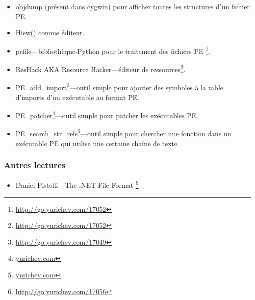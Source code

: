 \begin{itemize}
\item objdump (présent dans cygwin) pour afficher toutes les structures d'un fichier PE.

\item Hiew() comme éditeur.

\item pefile---bibliothèque-Python pour le traitement des fichiers PE \footnote{\url{http://go.yurichev.com/17052}}.

\item ResHack \acs{AKA} Resource Hacker---éditeur de ressources\footnote{\url{http://go.yurichev.com/17052}}.

\item PE\_add\_import\footnote{\url{http://go.yurichev.com/17049}}---outil simple
pour ajouter des symboles à la table d'imports d'un exécutable au format PE.

\item PE\_patcher\footnote{\href{http://go.yurichev.com/17054}{yurichev.com}}---outil
simple pour patcher les exécutables PE.

\item PE\_search\_str\_refs\footnote{\href{http://go.yurichev.com/17055}{yurichev.com}}---outil
simple pour chercher une fonction dans un exécutable PE qui utilise une certaine chaîne de texte.
\end{itemize}

\subsubsection{Autres lectures}

\begin{itemize}
\item Daniel Pistelli---The .NET File Format \footnote{\url{http://go.yurichev.com/17056}}
\end{itemize}

